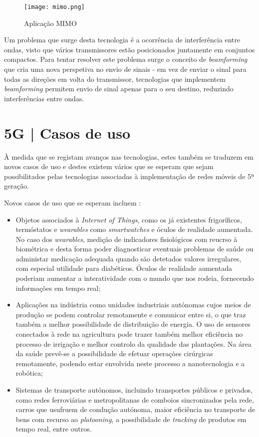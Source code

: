 \documentclass{llncs}
\begin{document}
\begin{figure}
    \centering
    \texttt{[image: mimo.png]}
    \caption{Aplicação MIMO \cite{MIMO}}
\end{figure}

\hspace*{1.5em} Um problema que surge desta tecnologia é a ocorrência de interferência entre ondas, visto que vários transmissores estão posicionados juntamente em conjuntos compactos. Para tentar resolver este problema surge o conceito de \textit{beamforming} que cria uma nova perspetiva no envio de sinais - em vez de enviar o sinal para todas as direções em volta do transmissor, tecnologias que implementem \textit{beamforming} permitem envio de sinal apenas para o seu destino, reduzindo interferências entre ondas.

\section{5G | Casos de uso }

À medida que se registam avanços nas tecnologias, estes também se traduzem em novos casos de uso e destes existem vários que se esperam que sejam possibilitados pelas tecnologias associadas à implementação de redes móveis de 5ª geração.

Novos casos de uso que se esperam incluem :
\begin{itemize}
    \item Objetos associados à \textit{Internet of Things}, como os já existentes frigoríficos, termóstatos e \textit{wearables} como \textit{smartwatches} e óculos de realidade aumentada. No caso dos \textit{wearables}, medição de indicadores fisiológicos com reucrso à biométrica e desta forma poder diagnosticar eventuais problemas de saúde ou administar medicação adequada quando são detetados valores irregulares, com especial utilidade para diabéticos. Óculos de realidade aumentada poderiam aumentar a interatividade com o mundo que nos rodeia, fornecendo informações em tempo real;
    \item Aplicações na indústria como unidades industriais autónomas cujos meios de produção se podem controlar remotamente e comunicar entre si, o que traz também a melhor possibilidade de distribuição de energia. O uso de sensores conectados à rede na agricultura pode trazer também melhor eficiência no processo de irrigação e melhor controlo da qualidade das plantações. Na área da saúde prevê-se a possibilidade de efetuar operações cirúrgicas remotamente, podendo estar envolvida neste processo a nanotecnologia e a robótica;
    \item Sistemas de transporte autónomos, incluindo transportes públicos e privados, como redes ferroviárias e metropolitanas de comboios sincronizados pela rede, carros que usufruem de condução autónoma, maior eficiência no transporte de bens com recurso ao \textit{platooning}, a possibilidade de \textit{tracking} de produtos em tempo real, entre outros.
\end{itemize}
\end{document}
